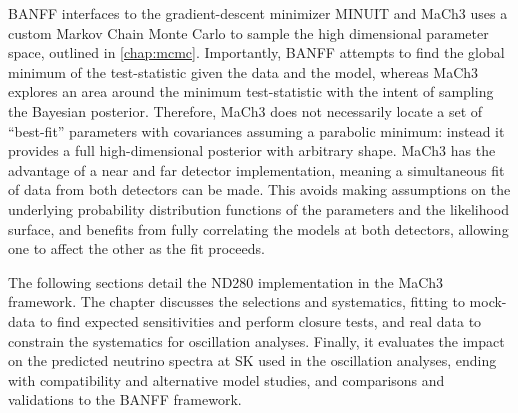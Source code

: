 BANFF interfaces to the gradient-descent minimizer MINUIT\cite{minuit} and MaCh3 uses a custom Markov Chain Monte Carlo to sample the high dimensional parameter space, outlined in \autoref{chap:mcmc}. Importantly, BANFF attempts to find the global minimum of the test-statistic given the data and the model, whereas MaCh3 explores an area around the minimum test-statistic with the intent of sampling the Bayesian posterior. Therefore, MaCh3 does not necessarily locate a set of ``best-fit'' parameters with covariances assuming a parabolic minimum: instead it provides a full high-dimensional posterior with arbitrary shape. MaCh3 has the advantage of a near and far detector implementation, meaning a simultaneous fit of data from both detectors can be made\cite{t2k_2015,thesis_elder, thesis_leila, thesis_kirsty, thesis_rich}. This avoids making assumptions on the underlying probability distribution functions of the parameters and the likelihood surface, and benefits from fully correlating the models at both detectors, allowing one to affect the other as the fit proceeds.

The following sections detail the ND280 implementation in the MaCh3 framework. The chapter discusses the selections and systematics, fitting to mock-data to find expected sensitivities and perform closure tests, and real data to constrain the systematics for oscillation analyses. Finally, it evaluates the impact on the predicted neutrino spectra at SK used in the oscillation analyses, ending with compatibility and alternative model studies, and comparisons and validations to the BANFF framework.